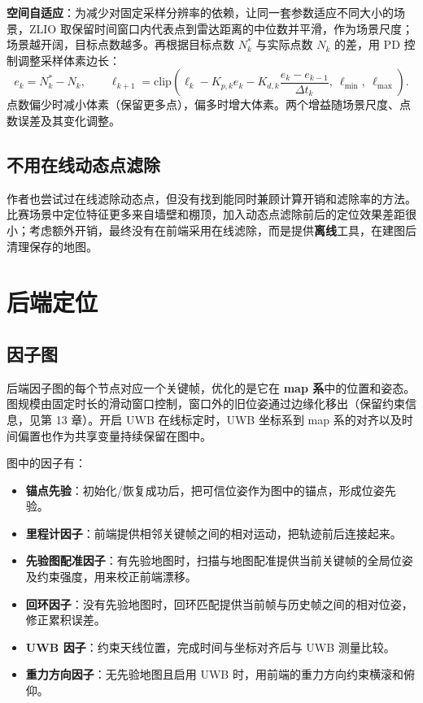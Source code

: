 \textbf{空间自适应}：为减少对固定采样分辨率的依赖，让同一套参数适应不同大小的场景，ZLIO 取保留时间窗口内代表点到雷达距离的中位数并平滑，作为场景尺度；场景越开阔，目标点数越多。再根据目标点数 $N_k^{*}$ 与实际点数 $N_k$ 的差，用 PD 控制调整采样体素边长：
\begin{equation}
e_k=N_k^{*}-N_k,\qquad
\ell_{k+1}=\mathrm{clip}\left(\ell_k-K_{p,k}e_k-K_{d,k}\frac{e_k-e_{k-1}}{\Delta t_k},\ \ell_{\min},\ \ell_{\max}\right).
\label{eq:23-space}
\end{equation}
点数偏少时减小体素（保留更多点），偏多时增大体素。两个增益随场景尺度、点数误差及其变化调整。

\subsection{不用在线动态点滤除}

作者也尝试过在线滤除动态点，但没有找到能同时兼顾计算开销和滤除率的方法。比赛场景中定位特征更多来自墙壁和棚顶，加入动态点滤除前后的定位效果差距很小；考虑额外开销，最终没有在前端采用在线滤除，而是提供\textbf{离线}工具，在建图后清理保存的地图。

\section{后端定位}\label{sec:23-backend}

\subsection{因子图}

后端因子图的每个节点对应一个关键帧，优化的是它在 \textbf{map 系}中的位置和姿态。图规模由固定时长的滑动窗口控制，窗口外的旧位姿通过边缘化移出（保留约束信息，见第 13 章）。开启 UWB 在线标定时，UWB 坐标系到 map 系的对齐以及时间偏置也作为共享变量持续保留在图中。

图中的因子有：
\begin{itemize}
  \item \textbf{锚点先验}：初始化/恢复成功后，把可信位姿作为图中的锚点，形成位姿先验。
  \item \textbf{里程计因子}：前端提供相邻关键帧之间的相对运动，把轨迹前后连接起来。
  \item \textbf{先验图配准因子}：有先验地图时，扫描与地图配准提供当前关键帧的全局位姿及约束强度，用来校正前端漂移。
  \item \textbf{回环因子}：没有先验地图时，回环匹配提供当前帧与历史帧之间的相对位姿，修正累积误差。
  \item \textbf{UWB 因子}：约束天线位置，完成时间与坐标对齐后与 UWB 测量比较。
  \item \textbf{重力方向因子}：无先验地图且启用 UWB 时，用前端的重力方向约束横滚和俯仰。
\end{itemize}

